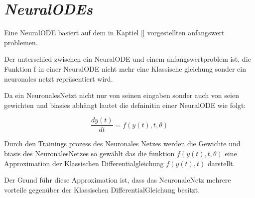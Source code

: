 \section{\textit{NeuralODEs}} \label{sec:neural_ode}
Eine NeuralODE basiert auf dem in Kaptiel \ref{} vorgestellten anfangswert problemen.

Der unterschied zwischen ein NeuralODE und einem anfangswertproblem ist, 
die Funktion f in einer NeuralODE nicht mehr eine Klassische gleichung sonder ein 
neuronales netzt repräsentiert wird.

Da ein NeuronalesNetzt nicht nur von seinen eingaben sonder auch von seien gewichten und biasies abhängt
lautet die defninitin einer NeuralODE wie folgt:

$$
\frac{d y(t)}{dt} = f(y(t), t, \theta)
$$

Durch den Trainings prozess des Neuronales Netzes werden die Gewichte und biasis des NeuronalesNetzes 
so gewählt das die funktion $f(y(t), t, \theta)$ eine Approximation der Klassischen Differentialgleichung 
$f(y(t), t)$ darstellt.

Der Grund führ diese Approximation ist, dass das NeuronaleNetz mehrere vorteile gegenüber der Klassischen DifferentialGleichung besitzt.







